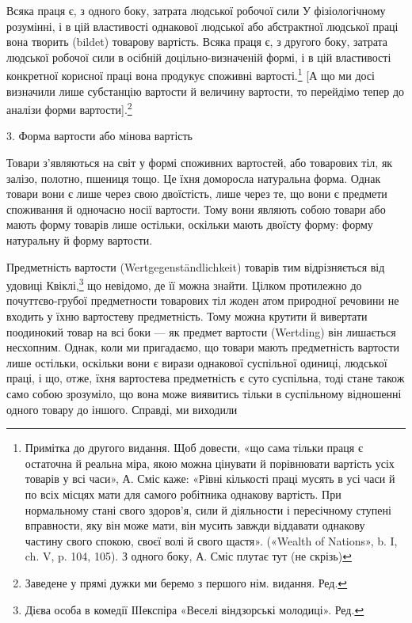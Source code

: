 Всяка праця є, з одного боку, затрата людської робочої сили
У фізіологічному розумінні, і в цій властивості однакової людської
або абстрактної людської праці вона творить (bildet) товарову
вартість. Всяка праця є, з другого боку, затрата людської робочої
сили в осібній доцільно-визначеній формі, і в цій властивості
конкретної корисної праці вона продукує споживні вартості.\footnote{
Примітка до другого видання. Щоб довести, «що сама тільки праця є
остаточна й реальна міра, якою можна цінувати й порівнювати вартість
усіх товарів у всі часи», А. Сміс каже: «Рівні кількості праці мусять в
усі часи й по всіх місцях мати для самого робітника однакову вартість.
При нормальному стані свого здоров'я, сили й діяльности і пересічному
ступені вправности, яку він може мати, він мусить завжди віддавати однакову
частину свого спокою, своєї волі й свого щастя». («Wealth of Nations»,
b. I, ch. V, p. 104, 105). З одного боку, А. Сміс плутає тут (не скрізь)
}
[А що ми досі визначили лише субстанцію вартости й величину
вартости, то перейдімо тепер до аналізи форми вартости].\footnote*{
Заведене у прямі дужки ми беремо з першого нім. видання. Ред.
}

3. Форма вартости або мінова вартість

Товари з’являються на світ у формі споживних вартостей, або
товарових тіл, як залізо, полотно, пшениця тощо. Це їхня доморосла
натуральна форма. Однак товари вони є лише через свою
двоїстість, лише через те, що вони є предмети споживання й одночасно
носії вартости. Тому вони являють собою товари або мають
форму товарів лише остільки, оскільки мають двоїсту форму:
форму натуральну й форму вартости.

Предметність вартости (Wertgegenständlichkeit) товарів тим
відрізняється від удовиці Квіклі,\footnote*{
Дієва особа в комедії ІІІекспіра «Веселі віндзорські молодиці».
Ред.
} що невідомо, де її можна
знайти. Цілком протилежно до почуттєво-грубої предметности
товарових тіл жоден атом природної речовини не входить у їхню
вартостеву предметність. Тому можна крутити й вивертати поодинокий
товар на всі боки — як предмет вартости (Wertding)
він лишається несхопним. Однак, коли ми пригадаємо, що товари
мають предметність вартости лише остільки, оскільки вони є
вирази однакової суспільної одиниці, людської праці, і що, отже,
їхня вартостева предметність є суто суспільна, тоді стане також
само собою зрозуміло, що вона може виявитись тільки в суспільному
відношенні одного товару до іншого. Справді, ми виходили


